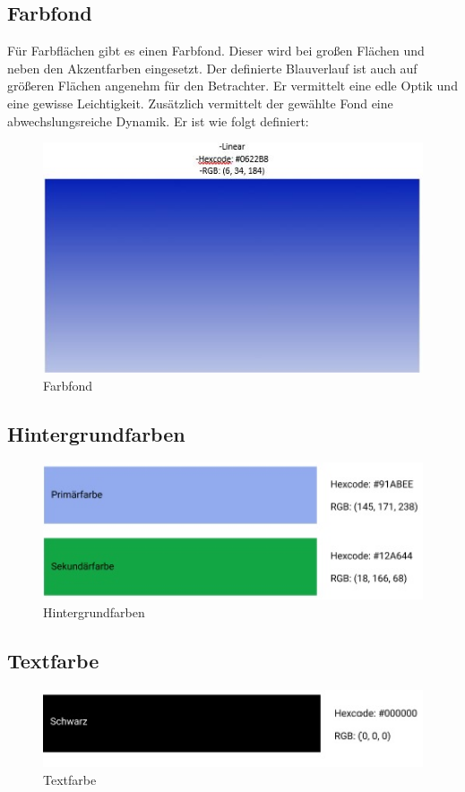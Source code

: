 \documentclass[11pt,
paper=a4,
bibtotocnumbered,	  %
liststotocnumbered,  %
DIV=calc,		  %
tablecaptionabove,	  %
headinclude,
]{article}
\begin{document}
\subsection{Farbfond}
Für Farbflächen gibt es einen Farbfond. Dieser wird bei großen Flächen und neben den Akzentfarben eingesetzt. Der definierte Blauverlauf ist auch auf größeren Flächen angenehm für den Betrachter. Er vermittelt eine edle Optik und eine gewisse Leichtigkeit. Zusätzlich vermittelt der gewählte Fond eine abwechslungsreiche Dynamik. Er ist wie folgt definiert: 
\begin{figure}[H]
\includegraphics[width=1\textwidth]{Bilder/farbfont.jpg}
\caption{Farbfond}
\end{figure}
\subsection{Hintergrundfarben}
\begin{figure}[H]
\includegraphics[width=1\textwidth]{Bilder/Hintergrundfarben.jpg}
\caption{Hintergrundfarben}
\end{figure}
\subsection{Textfarbe}
\begin{figure}[H]
\includegraphics[width=1\textwidth]{Bilder/Textfarben.jpg}
\caption{Textfarbe}
\end{figure}
\end{document}
